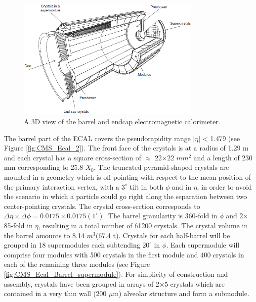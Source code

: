 \begin{figure}[h!]
\begin{center}
\includegraphics[width=0.8\textwidth]{figures/CMS/ECAL/ECAL.png}
\caption{A 3D view of the barrel and endcap electromagnetic calorimeter.}
\label{fig:CMS_Ecal_1}
\end{center}
\end{figure}

The barrel part of the ECAL covers the pseudorapidity range $|\eta|$ < 1.479 (see Figure \ref{fig:CMS_Ecal_2}). The front face of the crystals is at a radius of 1.29 m and each crystal has a square cross-section of $\approx$ 22$\times$22 $mm^{2}$ and a length of 230 mm corresponding to 25.8 $X_{0}$. The truncated pyramid-shaped crystals are mounted in a geometry which is off-pointing with respect to the mean position of the primary interaction vertex, with a $3^{\circ}$ tilt in both $\phi$ and in $\eta$, in order to avoid the scenario in which a particle could go right along the separation between two center-pointing crystals. The crystal cross-section corresponds to $\Delta\eta\times\Delta\phi=0.0175\times0.0175(1^{\circ})$. The barrel granularity is 360-fold in $\phi$ and 2$\times$85-fold in $\eta$, resulting in a total number of 61200 crystals. The crystal volume in the barrel amounts to 8.14 $m^{3}$(67.4 t). Crystals for each half-barrel will be grouped in 18 supermodules each subtending $20^{\circ}$ in
$\phi$. Each supermodule will comprise four modules with 500 crystals in the first module and 400 crystals in each of the remaining three modules (see Figure \ref{fig:CMS_Ecal_Barrel_supermodule}). For simplicity of construction and assembly, crystals have been grouped in arrays of 2$\times$5 crystals which are contained in a very thin wall (200 $\mu$m) alveolar structure and form a submodule.

